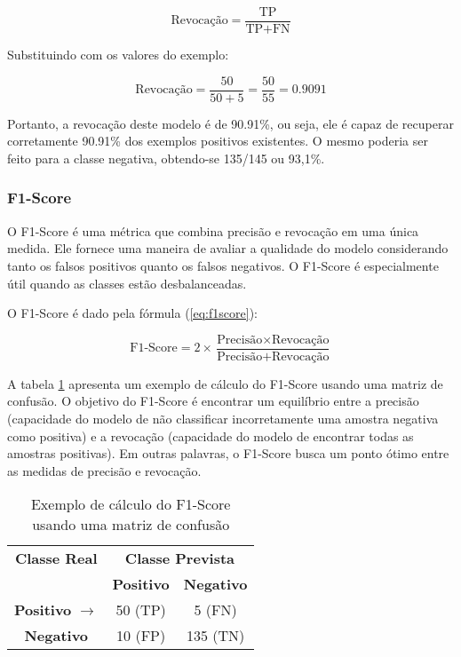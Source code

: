 \[ \text{Revocação} = \frac{\text{TP}}{\text{TP} + \text{FN}} \]

Substituindo com os valores do exemplo:

\[ \text{Revocação} = \frac{50}{50 + 5} = \frac{50}{55} = 0.9091 \]

Portanto, a revocação deste modelo é de 90.91\%, ou seja, ele é capaz de recuperar corretamente 90.91\% dos exemplos positivos existentes.  O mesmo poderia ser feito para a classe negativa, obtendo-se 135/145 ou 93,1\%.



\subsubsection{F1-Score}

O F1-Score é uma métrica que combina precisão e revocação em uma única medida. Ele fornece uma maneira de avaliar a qualidade do modelo considerando tanto os falsos positivos quanto os falsos negativos. O F1-Score é especialmente útil quando as classes estão desbalanceadas.

O F1-Score é dado pela fórmula (\ref{eq:f1score}):

\begin{equation}
\text{F1-Score} = 2 \times \frac{\text{Precisão} \times \text{Revocação}}{\text{Precisão} + \text{Revocação}} \label{eq:f1score}
\end{equation}

A tabela \ref{tab:exemplo_f1score} apresenta um exemplo de cálculo do F1-Score usando uma matriz de confusão. O objetivo do F1-Score é encontrar um equilíbrio entre a precisão (capacidade do modelo de não classificar incorretamente uma amostra negativa como positiva) e a revocação (capacidade do modelo de encontrar todas as amostras positivas). Em outras palavras, o F1-Score busca um ponto ótimo entre as medidas de precisão e revocação.

\begin{table}[h]
\centering
\caption{Exemplo de cálculo do F1-Score usando uma matriz de confusão}
\label{tab:exemplo_f1score}
\begin{tabular}{c|cc}
\multicolumn{1}{c}{\textbf{Classe Real}} & \multicolumn{2}{c}{\textbf{Classe Prevista}} \\ \cline{2-3}
\multicolumn{1}{c}{} & \textbf{Positivo}  & \textbf{Negativo} \\ \hline
\multicolumn{1}{c}{\textbf{Positivo} $\rightarrow$} & \cellcolor{green!25}50 (TP) & \cellcolor{red!25}5 (FN) \\
\multicolumn{1}{c}{\textbf{Negativo}} & \cellcolor{red!25}10 (FP)  & \cellcolor{green!25}135 (TN) \\ \hline
\end{tabular}
\end{table}

